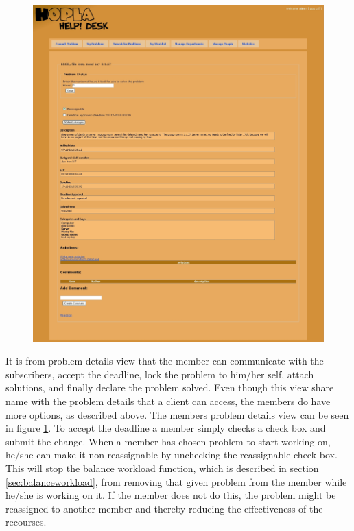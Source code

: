\begin{figure}[htb]
	\centering
		\includegraphics[width=1.00\textwidth, clip=true, trim=3cm 0.5cm 3cm 8cm]{input/implementation/program_presentation/staffProbDetails.png}
	\label{fig:staffProbDetails}
\end{figure}

It is from problem details view that the \astaff[] member can communicate with the subscribers, accept the deadline, lock the problem to him/her self, attach solutions, and finally declare the problem solved.
Even though this view share name with the problem details that a client can access, the \astaff[] members do have more options, as described above.
The \astaff[] members problem details view can be seen in figure \ref{fig:staffProbDetails}.
To accept the deadline a \astaff[] member simply checks a check box and submit the change.
When a \staff[] member has chosen problem to start working on, he/she can make it non-reassignable by unchecking the reassignable check box.
This will stop the balance workload function, which is described in section \ref{sec:balanceworkload}, from removing that given problem from the \astaff[] member while he/she is working on it.
If the \astaff[] member does not do this, the problem might be reassigned to another \astaff[] member and thereby reducing the effectiveness of the recourses.

